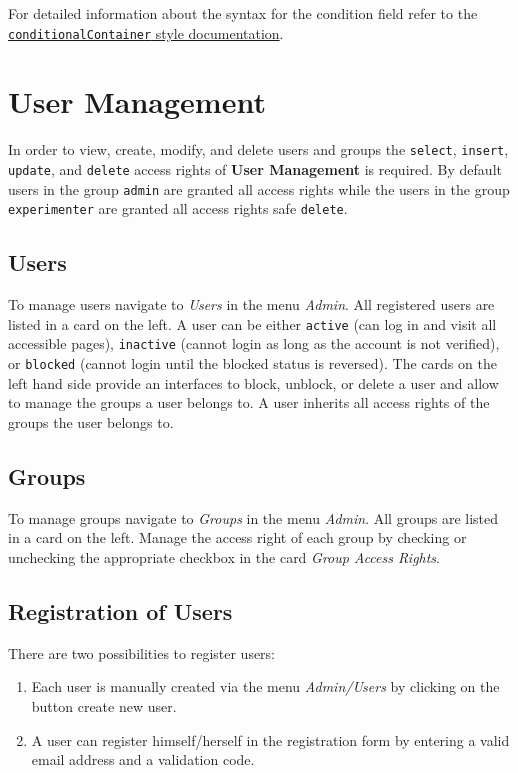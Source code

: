 \documentclass[a4paper,oneside]{book}
\begin{document}
For detailed information about the syntax for the condition field refer to the \href{https://selfhelp.psy.unibe.ch/demo/style/362}{\texttt{conditionalContainer} style documentation}.

\chapter{User Management}\label{sec.user}
In order to view, create, modify, and delete users and groups the \texttt{select}, \texttt{insert}, \texttt{update}, and \texttt{delete} access rights of \textbf{User Management} is required.
By default users in the group \texttt{admin} are granted all access rights while the users in the group \texttt{experimenter} are granted all access rights safe \texttt{delete}.

\section{Users}
To manage users navigate to \emph{Users} in the menu \emph{Admin}.
All registered users are listed in a card on the left.
A user can be either \texttt{active} (can log in and visit all accessible pages), \texttt{inactive} (cannot login as long as the account is not verified), or \texttt{blocked} (cannot login until the blocked status is reversed).
The cards on the left hand side provide an interfaces to block, unblock, or delete a user and allow to manage the groups a user belongs to.
A user inherits all access rights of the groups the user belongs to.

\section{Groups}
To manage groups navigate to \emph{Groups} in the menu \emph{Admin}.
All groups are listed in a card on the left.
Manage the access right of each group by checking or unchecking the appropriate checkbox in the card \emph{Group Access Rights}.

\section{Registration of Users}
There are two possibilities to register users:

\begin{enumerate}
    \item Each user is manually created via the menu \emph{Admin/Users} by clicking on the button create new user.
    \item A user can register himself/herself in the registration form by entering a valid email address and a validation code.
\end{enumerate}
\end{document}
